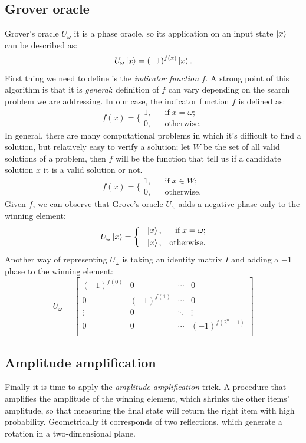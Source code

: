 \documentclass{article}
\begin{document}
\subsection{Grover oracle}
Grover's oracle $U_\omega$ it is a phase oracle, so its application on an input
state $\ket{x}$ can be described as:
\[
  U_\omega \ket{x} = (-1)^{f(x)} \ket{x}.
\]
First thing we need to define is the \emph{indicator function} $f$.
A strong point of this algorithm is that it is \emph{general}:
definition of $f$ can vary depending on the search problem we are addressing.
In our case, the indicator function $f$ is defined as:
\[
  f(x) = \bigg\{
  \begin{aligned}
    1, && \text{if} \; x = \omega; \\
    0, && \text{otherwise}.
  \end{aligned}
\]
In general, there are many computational problems in which it’s difficult to
find a solution, but relatively easy to verify a solution; let $W$ be the
set of all valid solutions of a problem, then $f$ will be the function that
tell us if a candidate solution $x$ it is a valid solution or not.
\[
  f(x) = \bigg\{
  \begin{aligned}
    1, && \text{if} \; x \in W; \\
    0, && \text{otherwise}.
  \end{aligned}
\]
Given $f$, we can observe that Grove's oracle $U_\omega$ adds a negative
phase only to the winning element:
\[
  U_\omega \ket{x} = \bigg\{
  \begin{aligned}
    - \ket{x}, && \text{if} \; x = \omega; \\
    \ket{x},   && \text{otherwise}.
  \end{aligned}
\]
Another way of representing $U_\omega$ is taking an identity matrix $I$ and
adding a $-1$ phase to the winning element:
\[
  U_\omega =
  \begin{bmatrix}
    (-1)^{f(0)} &   0         & \cdots &   0         \\
    0           & (-1)^{f(1)} & \cdots &   0         \\
    \vdots      &   0         & \ddots & \vdots      \\
    0           &   0         & \cdots & (-1)^{f(2^n-1)} \\
  \end{bmatrix}
\]

\subsection{Amplitude amplification}
Finally it is time to apply the \emph{amplitude amplification} trick.
A procedure that amplifies the amplitude of the winning element,
which shrinks the other items' amplitude, so that measuring the final state
will return the right item with high probability.
Geometrically it corresponds of two reflections, which generate a rotation in a
two-dimensional plane.
\end{document}

